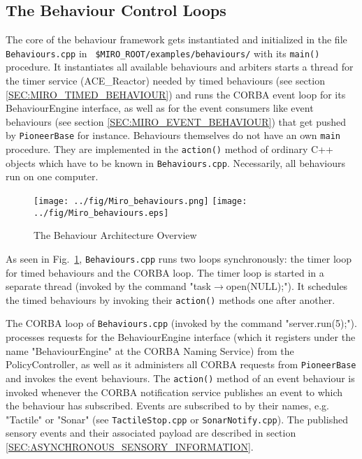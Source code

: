 \subsection{The Behaviour Control Loops}

The core of the behaviour framework gets instantiated and initialized
in the file {\tt Behaviours.cpp} in {\tt
  \$MIRO\_ROOT/examples/behaviours/} with its {\tt main()} procedure.
It instantiates all available behaviours and arbiters starts a thread
for the timer service (ACE\_Reactor) needed by timed behaviours (see
section \ref{SEC:MIRO_TIMED_BEHAVIOUR}) and runs the CORBA event loop
for its BehaviourEngine interface, as well as for the event consumers
like event behaviours (see section \ref{SEC:MIRO_EVENT_BEHAVIOUR})
that get pushed by {\tt PioneerBase} for instance.  Behaviours
themselves do not have an own {\tt main} procedure.  They are
implemented in the {\tt action()} method of ordinary C++ objects which
have to be known in {\tt Behaviours.cpp}.  Necessarily, all behaviours
run on one computer.

\begin{figure}[!ht]
  \ifpdf
  \texttt{[image: ../fig/Miro\_behaviours.png]}
  \else
  \texttt{[image: ../fig/Miro\_behaviours.eps]}
  \fi
  \caption{The Behaviour Architecture Overview}
  \label{FIG_BEHAVIOUR_ARCHITECTURE}
\end{figure}


As seen in Fig.~\ref{FIG_BEHAVIOUR_ARCHITECTURE}, {\tt Behaviours.cpp}
runs two loops synchronously: the timer loop for timed behaviours and
the CORBA loop.
The timer loop is started in a separate thread (invoked by the command
"task$\rightarrow$open(NULL);").
It schedules the timed behaviours
by invoking their {\tt action()} methods one after another. 

The CORBA loop of {\tt Behaviours.cpp} (invoked by the command
"server.run(5);").  processes requests for the BehaviourEngine
interface (which it registers under the name "BehaviourEngine" at the
CORBA Naming Service) from the PolicyController, as well as it
administers all CORBA requests from {\tt PioneerBase} and invokes the
event behaviours.  The {\tt action()} method of an event behaviour is
invoked whenever the CORBA notification service publishes an event to
which the behaviour has subscribed.  Events are subscribed to by their
names, e.g. "Tactile" or "Sonar" (see {\tt TactileStop.cpp} or 
{\tt SonarNotify.cpp}). The published sensory events and their associated
payload are described in section \ref{SEC:ASYNCHRONOUS_SENSORY_INFORMATION}.

